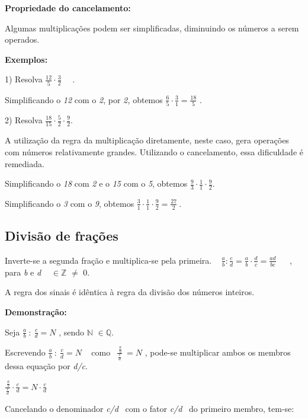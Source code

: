 \textbf{Propriedade do cancelamento:}

Algumas multiplicações podem ser simplificadas, diminuindo os números a serem operados.

\textbf{Exemplos: }

1) Resolva \( \frac{12}{5} \cdot \frac{3}{2}\text{~~~ .} \) 

Simplificando o \textit{12} com o \textit{2}, por \textit{2,} obtemos   \( \frac{6}{5} \cdot \frac{3}{1}=\frac{18}{5} \) {\fontsize{16pt}{19.2pt}\selectfont .}

2) Resolva \( \frac{18}{15} \cdot \frac{5}{2} \cdot \frac{9}{2}\text{.} \)

A utilização da regra da multiplicação diretamente, neste caso, gera operações com números relativamente grandes. Utilizando o cancelamento, essa dificuldade é remediada.

Simplificando o \textit{18} com \textit{2} e o \textit{15} com o \textit{5}, obtemos  \( \frac{9}{3} \cdot \frac{1}{1} \cdot \frac{9}{2}. \) 

Simplificando o \textit{3} com o \textit{9}, obtemos  \( \frac{3}{1} \cdot \frac{1}{1} \cdot \frac{9}{2}=\frac{27}{2}~. \) \quad 

\subsection{Divisão de frações}

\begin{caixa}
\quad Inverte-se a segunda fração e multiplica-se pela primeira.
~ \quad \quad  \( \frac{a}{b}:\frac{c}{d}=\frac{a}{b} \cdot \frac{d}{c}=\frac{ad}{bc}~~ \) ~ , para \textit{b} e \textit{d} \textit{~  \( \in \mathbb{Z} \) }  $ \neq $   0.
\end{caixa}
A regra dos sinais é idêntica à regra da divisão dos números inteiros.

\textbf{Demonstração: }

Seja \( \frac{a}{b}~:~\frac{c}{d}=N \) , sendo $\mathbb{N}$  \( \in \mathbb{Q} \).

Escrevendo \( \frac{a}{b}~:~\frac{c}{d}=N \) ~ como  \( ~~\frac{~\frac{a}{b}}{\frac{c}{d}}~ =N \)  , pode-se multiplicar ambos os membros dessa equação por \textit{d/c}.

\quad  \(\frac{~\frac{a}{b}}{\frac{c}{d}}  \cdot  \frac{c}{d} =N  \cdot  \frac{c}{d} \) 

Cancelando o denominador \textit{c/d}~ com o fator \textit{c/d}~ do primeiro membro, tem-se:

